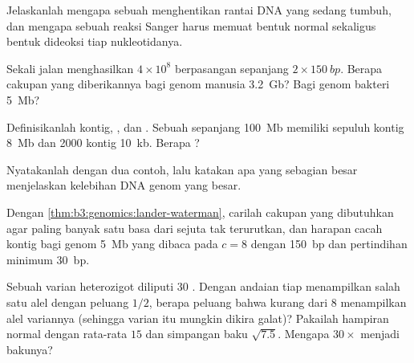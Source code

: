 \begin{exercise}[$\star$]\label{exo:b3:genomics:1}
Jelaskanlah mengapa sebuah  menghentikan rantai DNA yang
sedang tumbuh, dan mengapa sebuah reaksi Sanger harus memuat bentuk normal
sekaligus bentuk dideoksi tiap nukleotidanya.
\end{exercise}

\begin{exercise}[$\star$]\label{exo:b3:genomics:2}
Sekali jalan menghasilkan $4\times 10^{8}$  berpasangan sepanjang
$2\times \qty{150}{bp}$. Berapa cakupan yang diberikannya bagi genom manusia
\qty{3.2}{Gb}? Bagi genom bakteri \qty{5}{Mb}?
\end{exercise}

\begin{exercise}[$\star$]\label{exo:b3:genomics:3}
Definisikanlah kontig, , dan . Sebuah  sepanjang
\qty{100}{Mb} memiliki sepuluh kontig \qty{8}{Mb} dan \num{2000} kontig
\qty{10}{kb}. Berapa ?
\end{exercise}

\begin{exercise}[$\star$]\label{exo:b3:genomics:4}
Nyatakanlah  dengan dua contoh, lalu katakan apa yang
sebagian besar menjelaskan kelebihan DNA genom yang besar.
\end{exercise}

\begin{exercise}[$\star\star$]\label{exo:b3:genomics:5}
Dengan \cref{thm:b3:genomics:lander-waterman}, carilah cakupan yang
dibutuhkan agar paling banyak satu basa dari sejuta tak terurutkan, dan
harapan cacah kontig bagi genom \qty{5}{Mb} yang dibaca pada $c = 8$ dengan
 \qty{150}{bp} dan pertindihan minimum \qty{30}{bp}.
\end{exercise}

\begin{exercise}[$\star\star$]\label{exo:b3:genomics:6}
Sebuah varian heterozigot diliputi $30$ . Dengan andaian tiap 
menampilkan salah satu alel dengan peluang $1/2$, berapa peluang bahwa kurang
dari $8$  menampilkan alel variannya (sehingga varian itu mungkin
dikira galat)? Pakailah hampiran normal dengan rata-rata $15$ dan
simpangan baku $\sqrt{7.5}$. Mengapa $30\times$ menjadi bakunya?
\end{exercise}

